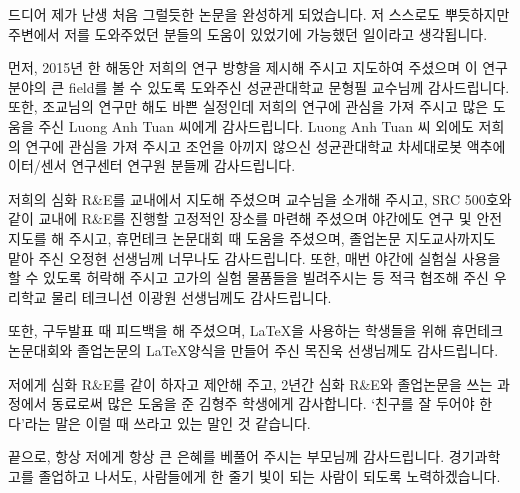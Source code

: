 \clearpage
\begin{onehalfspace} %
	
	
\end{onehalfspace}



\begin{acknowledgements}
드디어 제가 난생 처음 그럴듯한 논문을 완성하게 되었습니다. 저 스스로도 뿌듯하지만 주변에서 저를 도와주었던 분들의 도움이 있었기에 가능했던 일이라고 생각됩니다.

먼저, 2015년 한 해동안 저희의 연구 방향을 제시해 주시고 지도하여 주셨으며 이 연구 분야의 큰 field를 볼 수 있도록 도와주신 성균관대학교 문형필 교수님께 감사드립니다. 또한, 조교님의 연구만 해도 바쁜 실정인데 저희의 연구에 관심을 가져 주시고 많은 도움을 주신 Luong Anh Tuan 씨에게 감사드립니다. Luong Anh Tuan 씨 외에도 저희의 연구에 관심을 가져 주시고 조언을 아끼지 않으신 성균관대학교 차세대로봇 액추에이터/센서 연구센터 연구원 분들께 감사드립니다.

저희의 심화 R\&E를 교내에서 지도해 주셨으며 교수님을 소개해 주시고, SRC 500호와 같이 교내에 R\&E를 진행할 고정적인 장소를 마련해 주셨으며 야간에도 연구 및 안전 지도를 해 주시고, 휴먼테크 논문대회 때 도움을 주셨으며, 졸업논문 지도교사까지도 맡아 주신 오정현 선생님께 너무나도 감사드립니다. 또한, 매번 야간에 실험실 사용을 할 수 있도록 허락해 주시고 고가의 실험 물품들을 빌려주시는 등 적극 협조해 주신 우리학교 물리 테크니션 이광원 선생님께도 감사드립니다.

또한, 구두발표 때 피드백을 해 주셨으며, \LaTeX 을 사용하는 학생들을 위해 휴먼테크논문대회와 졸업논문의 \LaTeX 양식을 만들어 주신 목진욱 선생님께도 감사드립니다. %

저에게 심화 R\&E를 같이 하자고 제안해 주고, 2년간 심화 R\&E와 졸업논문을 쓰는 과정에서 동료로써 많은 도움을 준 김형주 학생에게 감사합니다. 
`친구를 잘 두어야 한다'라는 말은 이럴 때 쓰라고 있는 말인 것 같습니다.

끝으로, 항상 저에게 항상 큰 은혜를 베풀어 주시는 부모님께 감사드립니다. 경기과학고를 졸업하고 나서도, 사람들에게 한 줄기 빛이 되는 사람이 되도록 노력하겠습니다.
\end{acknowledgements}

